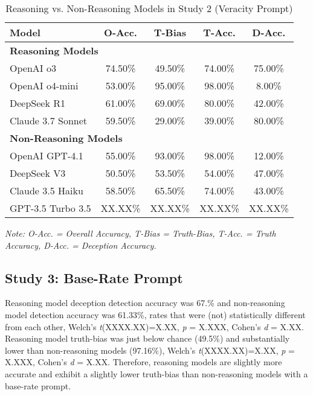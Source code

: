 \documentclass{article}
\begin{document}
\begin{table}[ht]
\centering
\caption{Reasoning vs. Non-Reasoning Models in Study 2 (Veracity Prompt)}
\begin{tabular}{lcccc}
\toprule
\textbf{Model} & \textbf{O-Acc.} & \textbf{T-Bias} & \textbf{T-Acc.} & \textbf{D-Acc.} \\
\midrule
\multicolumn{5}{l}{\textbf{Reasoning Models}} \\
OpenAI o3 & 74.50\% & 49.50\% & 74.00\% & 75.00\% \\
OpenAI o4-mini & 53.00\% & 95.00\% & 98.00\% & 8.00\% \\
DeepSeek R1 & 61.00\% & 69.00\% & 80.00\% & 42.00\% \\
Claude 3.7 Sonnet & 59.50\% & 29.00\% & 39.00\% & 80.00\% \\
\midrule
\multicolumn{5}{l}{\textbf{Non-Reasoning Models}} \\
OpenAI GPT-4.1 & 55.00\% & 93.00\% & 98.00\% & 12.00\% \\
DeepSeek V3 & 50.50\% & 53.50\% & 54.00\% & 47.00\% \\
Claude 3.5 Haiku & 58.50\% & 65.50\% & 74.00\% & 43.00\% \\
GPT-3.5 Turbo 3.5 & XX.XX\% & XX.XX\% & XX.XX\% & XX.XX\% \\
\bottomrule
\end{tabular}
\begin{minipage}{0.7\linewidth}
\vspace{0.05in}
\footnotesize
\textit{Note: O-Acc. = Overall Accuracy, T-Bias = Truth-Bias, T-Acc. = Truth Accuracy, D-Acc. = Deception Accuracy.}
\end{minipage}
\label{tab:study1_model_comparison}
\end{table}

\subsection{Study 3: Base-Rate Prompt}

Reasoning model deception detection accuracy was 67.\% and non-reasoning model detection accuracy was 61.33\%, rates that were (not) statistically different from each other, Welch's \textit{t}(XXXX.XX)=X.XX, \textit{p} = X.XXX, Cohen's \textit{d} = X.XX. Reasoning model truth-bias was just below chance (49.5\%) and substantially lower than non-reasoning models (97.16\%), Welch's \textit{t}(XXXX.XX)=X.XX, \textit{p} = X.XXX, Cohen's \textit{d} = X.XX. Therefore, reasoning models are slightly more accurate and exhibit a slightly lower truth-bias than non-reasoning models with a base-rate prompt.
\end{document}
